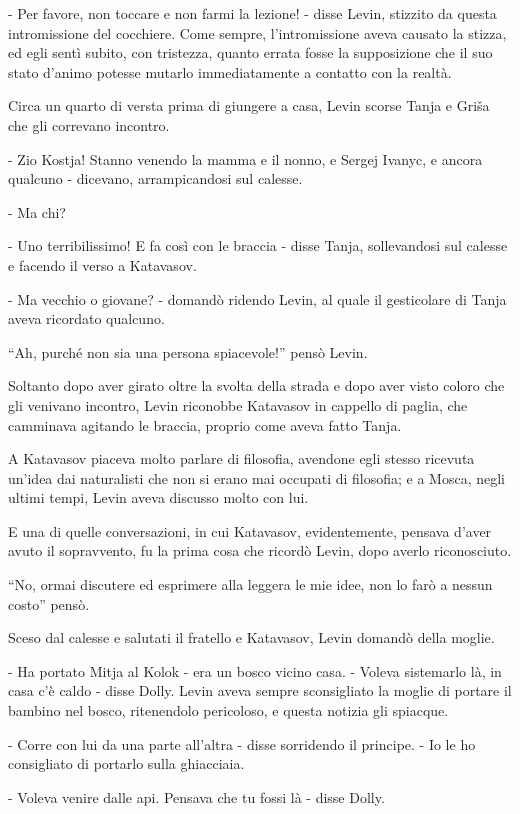 - Per favore, non toccare e non farmi la lezione! - disse Levin, stizzito da questa intromissione del cocchiere. Come sempre, l'intromissione aveva causato la stizza, ed egli sentì subito, con tristezza, quanto errata fosse la supposizione che il suo stato d'animo potesse mutarlo immediatamente a contatto con la realtà. 

Circa un quarto di versta prima di giungere a casa, Levin scorse Tanja e Griša che gli correvano incontro. 

- Zio Kostja! Stanno venendo la mamma e il nonno, e Sergej Ivanyc, e ancora qualcuno - dicevano, arrampicandosi sul calesse. 

- Ma chi? 

- Uno terribilissimo! E fa così con le braccia - disse Tanja, sollevandosi sul calesse e facendo il verso a Katavasov. 

- Ma vecchio o giovane? - domandò ridendo Levin, al quale il gesticolare di Tanja aveva ricordato qualcuno. 

``Ah, purché non sia una persona spiacevole!'' pensò Levin. 

Soltanto dopo aver girato oltre la svolta della strada e dopo aver visto coloro che gli venivano incontro, Levin riconobbe Katavasov in cappello di paglia, che camminava agitando le braccia, proprio come aveva fatto Tanja. 

A Katavasov piaceva molto parlare di filosofia, avendone egli stesso ricevuta un'idea dai naturalisti che non si erano mai occupati di filosofia; e a Mosca, negli ultimi tempi, Levin aveva discusso molto con lui. 

E una di quelle conversazioni, in cui Katavasov, evidentemente, pensava d'aver avuto il sopravvento, fu la prima cosa che ricordò Levin, dopo averlo riconosciuto. 

``No, ormai discutere ed esprimere alla leggera le mie idee, non lo farò a nessun costo'' pensò. 

Sceso dal calesse e salutati il fratello e Katavasov, Levin domandò della moglie. 

- Ha portato Mitja al Kolok - era un bosco vicino casa. - Voleva sistemarlo là, in casa c'è caldo - disse Dolly. Levin aveva sempre sconsigliato la moglie di portare il bambino nel bosco, ritenendolo pericoloso, e questa notizia gli spiacque. 

- Corre con lui da una parte all'altra - disse sorridendo il principe. - Io le ho consigliato di portarlo sulla ghiacciaia. 

- Voleva venire dalle api. Pensava che tu fossi là - disse Dolly. 

